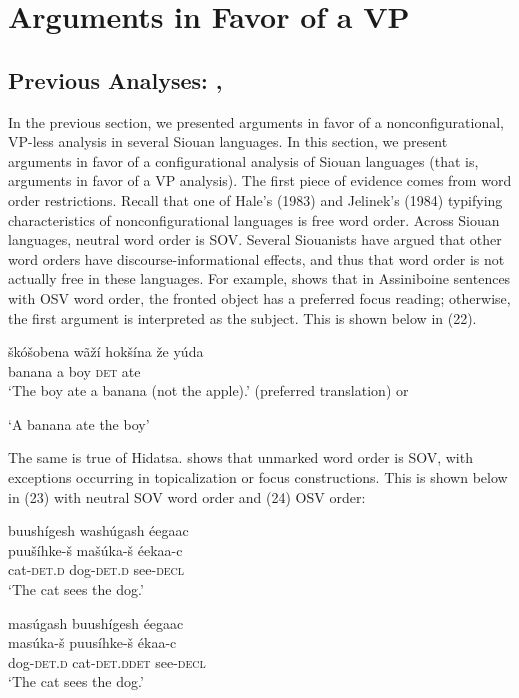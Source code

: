 \documentclass[output=paper]{LSP/langsci}
\begin{document}
\section{Arguments in Favor of a VP}

\subsection{Previous Analyses: \citet{Boyle2007}, \citet{Graczyk1991} \citet{West2003}}

In the previous section, we presented arguments in favor of a nonconfigurational, VP-less analysis in several Siouan languages.  In this section, we present arguments in favor of a configurational analysis of Siouan languages (that is, arguments in favor of a VP analysis).  The first piece of evidence comes from word order restrictions. Recall that one of Hale's (1983) and Jelinek's (1984) typifying characteristics of nonconfigurational languages is free word order.  Across Siouan languages, neutral word order is SOV.  Several Siouanists have argued that other word orders have discourse-informational effects, and thus that word order is not actually free in these languages. For example, \citet{West2003} shows that in Assiniboine sentences with OSV word order, the fronted object has a preferred focus reading; otherwise, the first argument is interpreted as the subject. This is shown below in (22). 

\begin{exe}
\ex	\gll  \v{s}k\'o\v{s}obena w\~a\v{z}\'i 	hok\v{s}\'ina 	\v{z}e 		y\'uda \\
banana 		a 			boy 	\textsc{det} 	ate \\
\trans `The boy ate a banana (not the apple).' (preferred translation) or 

`A banana ate the boy'  \citep[49]{West2003} 
\end{exe}

The same is true of Hidatsa.  \citet{Boyle2007} shows that unmarked word order is SOV, with exceptions occurring in topicalization or focus constructions.  This is shown below in (23) with neutral SOV word order and (24) OSV order:
\pagebreak
\begin{exe}
\ex 
\glll buush\'igesh wash\'ugash \'eegaac\\
puu\v{s}\'ihke-\v{s}  ma\v{s}\'uka-\v{s} \'eekaa-c \\
cat-\textsc{det.d} dog-\textsc{det.d} see-\textsc{decl}  \\
\trans `The cat sees the dog.'  \citep[214]{Boyle2007}

\ex 
\glll mas\'ugash 		buush\'igesh 	\'eegaac\\
mas\'uka-\v{s} 		puus\'ihke-\v{s} 	\'ekaa-c \\
dog-\textsc{det.d} 		cat-\textsc{det.d}\textsc{det}	see-\textsc{decl} \\
\trans `The cat sees the dog.' \citep[214]{Boyle2007}

\end{exe}
	
\end{document}
